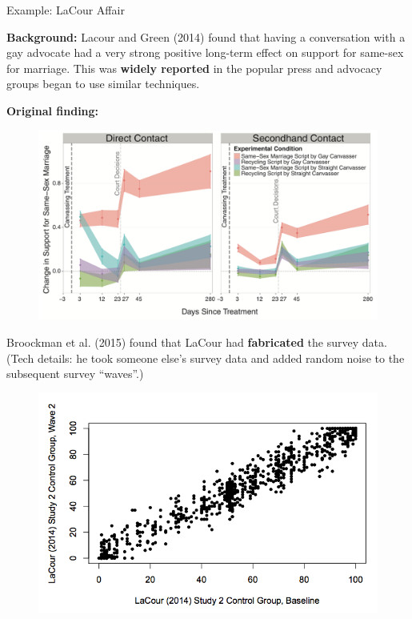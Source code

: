 \documentclass[10pt]{beamer}
\begin{document}
\begin{frame}{Example: LaCour Affair}

    \textbf{Background:} Lacour and Green (2014) found that having a conversation with a gay advocate had a very strong positive long-term effect on support for same-sex for marriage. This was \textbf{widely reported} in the popular press and advocacy groups began to use similar techniques.

    \textbf{Original finding:}

    \begin{figure}
        \includegraphics[scale=0.23]{img/lacour_original.png}
    \end{figure}

\end{frame}

\begin{frame}

     Broockman et al. (2015) found that LaCour had \textbf{fabricated} the survey data. (Tech details: he took someone else's survey data and added random noise to the subsequent survey ``waves''.)

     \begin{figure}
         \includegraphics[scale=0.3]{img/lacour_noise.png}
     \end{figure}

\end{frame}
\end{document}
